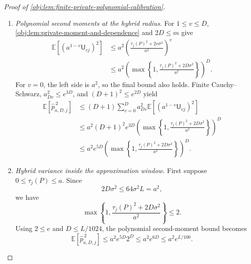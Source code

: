 \documentclass[11pt]{article}
\begin{document}
\begin{proof}[Proof of \cref{obj:lem:finite-private-polynomial-calibration}]
\begin{enumerate}
\item \textit{Polynomial second moments at the hybrid radius.}
For \(1\le v\le D\), \cref{obj:lem:private-moment-and-dependence} and \(2D\le m\) give
\[
\begin{aligned}
\mathbb E[(a^{1-v}\mathsf U_{vj})^2]
&\le a^2
 \left(\frac{\tau_j(P)^2+2v\sigma^2}{a^2}\right)^v\\
&\le a^2
 \left(\max\left\{1,\frac{\tau_j(P)^2+2D\sigma^2}{a^2}\right\}\right)^D.
\end{aligned}
\]
For \(v=0\), the left side is \(a^2\), so the final bound also holds. Finite Cauchy--Schwarz, \(a_{Dv}^2\le e^{3D}\), and \((D+1)^2\le e^{2D}\) yield
\[
\begin{aligned}
\mathbb E[\widehat p_{a,D,j}^{\,2}]
&\le(D+1)\sum_{v=0}^D
 a_{Dv}^2\mathbb E[(a^{1-v}\mathsf U_{vj})^2]\\
&\le a^2(D+1)^2e^{3D}
 \left(\max\left\{1,\frac{\tau_j(P)^2+2D\sigma^2}{a^2}\right\}\right)^D\\
&\le a^2e^{5D}
 \left(\max\left\{1,\frac{\tau_j(P)^2+2D\sigma^2}{a^2}\right\}\right)^D.
\end{aligned}
\]

\item \textit{Hybrid variance inside the approximation window.}
First suppose \(0\le\tau_j(P)\le a\). Since
\[
2D\sigma^2\le64\sigma^2L=a^2,
\]
we have
\[
\max\left\{1,\frac{\tau_j(P)^2+2D\sigma^2}{a^2}\right\}\le2.
\]
Using \(2\le e\) and \(D\le L/1024\), the polynomial second-moment bound becomes
\[
\mathbb E[\widehat p_{a,D,j}^{\,2}]
\le a^2e^{5D}2^D
\le a^2e^{6D}
\le a^2e^{L/100}.
\]


\end{enumerate}
\end{proof}
\end{document}
